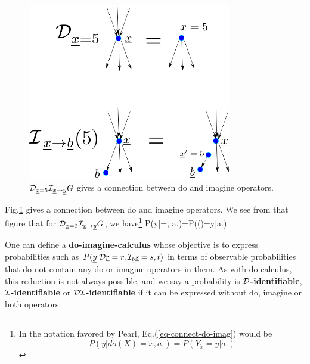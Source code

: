 \begin{figure}[h!]
\centering
\includegraphics[width=3.5in]
{counterf/rho-kappa.png}
\caption{${\cal D}_{{\underline{x}}=5}{\cal I}_{{\underline{x}}\rightarrow {\underline{y}}}G$
gives a connection
between do and imagine operators.
} 
\label{fig-rho-kappa}
\end{figure}

Fig.\ref{fig-rho-kappa}
gives  a connection
between do and imagine
operators.
We see
from that figure that
for ${\cal D}_{{\underline{x}}=\tilde{x}}
{\cal I}_{{\underline{x}}\rightarrow{\underline{y}}}G$, we have\footnote{In the
notation favored by Pearl, Eq.(\ref{eq-connect-do-imag})
 would be
$$P(y|do(X)=\tilde{x}, a.)=P(Y_{\tilde{x}}=y|a.)$$}
\beq
P(y|\cald\rvx=, a.)=P(\rvy()=y|a.)
\label{eq-connect-do-imag}
\eeq


One can define
a {\bf do-imagine-calculus}
whose
objective
is to 
express
probabilities such as 
$P({\underline{y}}|{\cal D}{\underline{r}}=r,
{\cal I}_{\underline{b}} {\underline{s}}=s, t)$
in terms of observable 
probabilities
that do not
contain
any do or imagine
operators in them.
As with
do-calculus,
this reduction
is not 
always possible,
and we say a probability is
{\bf ${\cal D}$-identifiable},
{\bf ${\cal I}$-identifiable}
or
{\bf ${\cal D}{\cal I}$-identifiable}
if it  can be 
expressed without do, imagine
or both operators.

